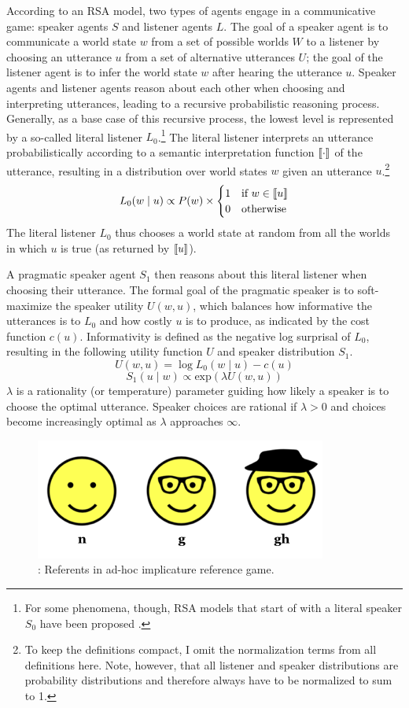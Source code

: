 According to an RSA model, two types of agents engage in a communicative game: speaker agents $S$ and listener agents $L$. The goal of a speaker agent is to communicate
a world state $w$ from a set of possible worlds $W$ to a listener by choosing an utterance $u$ from a set of alternative utterances $U$; the goal of the listener agent is to infer the world 
state $w$ after hearing the utterance $u$. Speaker agents and listener agents reason about each other when choosing and interpreting utterances, leading to a
recursive probabilistic reasoning process. Generally, as a base case of this recursive process, the lowest level is represented by a so-called literal listener $L_0$.\footnote{
For some phenomena, though, RSA models that start of with a literal speaker $S_0$ have been proposed .}
The literal listener interprets an utterance probabilistically according to a semantic interpretation function $\llbracket\cdot\rrbracket$ of the utterance, 
resulting in a distribution over world states $w$ given an utterance $u$.\footnote{To keep the definitions compact, I omit the normalization terms from all definitions here. 
Note, however, that all listener and speaker distributions are probability distributions and therefore always have to be normalized to sum to 1.}
$$L_0(w \mid u) \propto P(w) \times 
\begin{cases}
1 & \mbox{if } w \in \llbracket u\rrbracket \\
0 & \mbox{otherwise} 
\end{cases}$$
The literal listener $L_0$ thus chooses a world state at random from all the worlds in which $u$ is true (as returned by $\llbracket u\rrbracket$).

A pragmatic speaker agent $S_1$ then reasons about this literal listener when choosing their utterance. The formal goal of the 
pragmatic speaker is to soft-maximize \cite{Luce1959,Sutton1998} the speaker utility $U(w,u)$, which balances how informative the utterances is to $L_0$ and
how costly $u$ is to produce, as indicated by the cost function $c(u)$. Informativity is defined as the negative log surprisal of $L_0$, resulting
in the following utility function $U$ and speaker distribution $S_1$.
$$U(w,u) = \log L_0(w \mid u) - c(u)$$
$$S_1(u \mid w) \propto \mbox{exp} \left( \lambda U(w,u) \right)$$
$\lambda$ is a rationality (or temperature) parameter guiding how likely a speaker is to choose the optimal utterance. 
Speaker choices are rational if $\lambda > 0$ and choices become increasingly optimal as $\lambda$ approaches $\infty$.

\begin{figure}
\center
\includegraphics[width=.5\textwidth]{plots/faces-ad-hoc-implicature.png}
\caption{\label{fig:faces-ad-hoc-imp}: Referents in ad-hoc implicature reference game.}
\end{figure}

